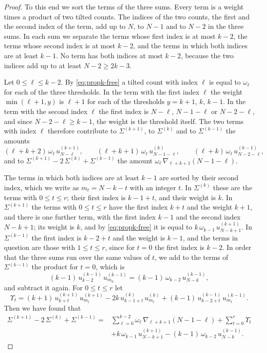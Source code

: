 \documentclass{amsart}
\theoremstyle{definition}
\theoremstyle{remark}
\numberwithin{equation}{section}
\begin{document}
\begin{proof}
To this end we sort the terms of the three sums. Every term
is a weight times a product of two tilted counts. The indices of the
two counts, the first and the second index of the term, add up to $N$, to
$N-1$ and to $N-2$ in the three sums. In each sum we separate the
terms whose first index is at most $k-2$, the terms whose second index is at
most $k-2$, and the terms in which both indices are at least $k-1$. No term
has both indices at most $k-2$, because the two indices add up to at least
$N-2\ge2k-3$.

Let $0\le\ell\le k-2$. By \eqref{eq:propk-free} a tilted count with index
$\ell$ is equal to $\omega_\ell$ for each of the three thresholds. In
the term with the first index $\ell$ the weight $\min(\ell+1,y)$ is $\ell+1$
for each of the thresholds $y=k+1$, $k$, $k-1$. In the term with the second
index $\ell$ the first index is $N-\ell$, $N-1-\ell$ or $N-2-\ell$, and
since $N-2-\ell\ge k-1$, the weight is the threshold itself. The two terms
with index $\ell$ therefore contribute to $\Sigma^{(k+1)}$, to
$\Sigma^{(k)}$ and to $\Sigma^{(k-1)}$ the amounts
\[
(\ell+k+2)\,\omega_\ell\,u^{(k+1)}_{N-\ell},\qquad
(\ell+k+1)\,\omega_\ell\,u^{(k)}_{N-1-\ell},\qquad
(\ell+k)\,\omega_\ell\,u^{(k-1)}_{N-2-\ell},
\]
and to $\Sigma^{(k+1)}-2\,\Sigma^{(k)}+\Sigma^{(k-1)}$ the amount
$\omega_\ell\,\nabla_{\ell+k+1}(N-1-\ell)$.

The terms in which both indices are at least $k-1$ are sorted by their
second index, which we write as $m_t=N-k-t$ with an integer $t$. In
$\Sigma^{(k)}$ these are the terms with $0\le t\le r$; their first index is
$k-1+t$, and their weight is $k$. In $\Sigma^{(k+1)}$ the terms with
$0\le t\le r$ have the first index $k+t$ and the weight $k+1$, and there is
one further term, with the first index $k-1$ and the second index $N-k+1$;
its weight is $k$, and by \eqref{eq:propk-free} it is equal to
$k\,\omega_{k-1}\,u^{(k+1)}_{N-k+1}$. In $\Sigma^{(k-1)}$ the first index is
$k-2+t$ and the weight is $k-1$, and the terms in question are those with
$1\le t\le r$, since for $t=0$ the first index is $k-2$. In order that the
three sums run over the same values of $t$, we add to the terms of
$\Sigma^{(k-1)}$ the product for $t=0$, which is
\[
(k-1)\,u^{(k-1)}_{k-2}\,u^{(k-1)}_{m_0}
=(k-1)\,\omega_{k-2}\,u^{(k-1)}_{N-k} ,
\]
and subtract it again. For $0\le t\le r$ let
\[
\Upsilon_t=(k+1)\,u^{(k+1)}_{k+t}\,u^{(k+1)}_{m_t}
-2k\,u^{(k)}_{k-1+t}\,u^{(k)}_{m_t}
+(k-1)\,u^{(k-1)}_{k-2+t}\,u^{(k-1)}_{m_t} .
\]
Then we have found that
\begin{equation}\label{eq:beyond-split}
\begin{split}
\Sigma^{(k+1)}-2\,\Sigma^{(k)}+\Sigma^{(k-1)}
={}&\sum_{\ell=0}^{k-2}\omega_\ell\,\nabla_{\ell+k+1}(N-1-\ell)
+\sum_{t=0}^{r}\Upsilon_t\\
&+k\,\omega_{k-1}\,u^{(k+1)}_{N-k+1}
-(k-1)\,\omega_{k-2}\,u^{(k-1)}_{N-k} .
\end{split}
\end{equation}


\end{proof}
\end{document}
